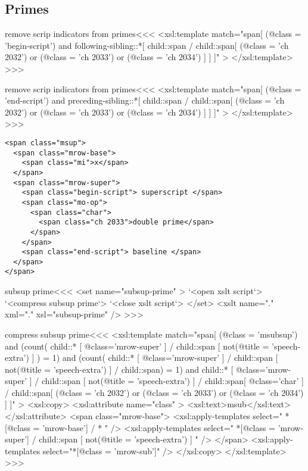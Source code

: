 \documentclass{article}
\begin{document}
\subsection{Primes}

\<remove scrip indicators from primes\><<<
<xsl:template match="span[
    (@class = 'begin-script')
  and
    following-sibling::*[
         child::span / child::span[ 
            (@class = 'ch 2032') or (@class = 'ch 2033')
                                 or (@class = 'ch 2034')
    ]    ]
]" >
</xsl:template> 
>>>



\<remove scrip indicators from primes\><<<
<xsl:template match="span[
    (@class = 'end-script')
  and
    preceding-sibling::*[
         child::span / child::span[ 
            (@class = 'ch 2032') or (@class = 'ch 2033') 
                                 or (@class = 'ch 2034')
    ]    ]
]" >
</xsl:template> 
>>>



\begin{verbatim}
<span class="msup">
  <span class="mrow-base">
    <span class="mi">x</span>
  </span>
  <span class="mrow-super">
    <span class="begin-script"> superscript </span>
    <span class="mo-op">
      <span class="char">
        <span class="ch 2033">double prime</span>
      </span>
    </span>
    <span class="end-script"> baseline </span>
  </span>
</span>
\end{verbatim}

\<subsup prime\><<<
<set name="subsup-prime" >
   `<open xslt script`>
   `<compress subsup prime`> 
   `<close xslt script`>
</set>
<xslt name="." xml="." xsl="subsup-prime" />
>>>


\<compress subsup prime\><<<
<xsl:template match="span[ 
    (@class = 'msubsup')
  and
    (count(
        child::* [ @class='mrow-super' ]
       / child::span [ not(@title = 'speech-extra') ] ) = 1)
  and
    (count(
       child::* [ @class='mrow-super' ]
          / child::span [ not(@title = 'speech-extra') ] 
          / child::span) = 1)
  and
    child::* [ @class='mrow-super' ]
       / child::span [ not(@title = 'speech-extra') ] 
       / child::span[ @class='char' ]
       / child::span[
            (@class = 'ch 2032') or (@class = 'ch 2033') 
                                 or (@class = 'ch 2034') 
         ]  
]" >  
  <xsl:copy>
    <xsl:attribute name="class" >
       <xsl:text>msub</xsl:text>
    </xsl:attribute>
    <span class="mrow-base"> 
       <xsl:apply-templates select="
             *[@class = 'mrow-base'] / *
          " />    
       <xsl:apply-templates select="
             *[@class = 'mrow-super']
             / child::span [ not(@title = 'speech-extra') ] 
          " />    
    </span> 
    <xsl:apply-templates select="*[@class = 'mrow-sub']" />
  </xsl:copy>
</xsl:template> 
>>>
\end{document}
